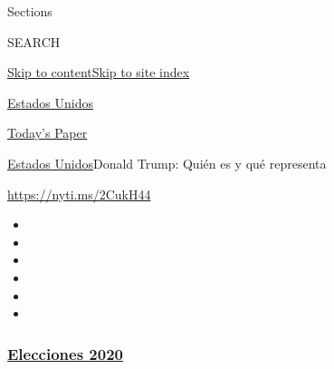 Sections

SEARCH

\protect\hyperlink{site-content}{Skip to
content}\protect\hyperlink{site-index}{Skip to site index}

\href{https://www.nytimes3xbfgragh.onion/es/section/estados-unidos}{Estados
Unidos}

\href{https://myaccount.nytimes3xbfgragh.onion/auth/login?response_type=cookie\&client_id=vi}{}

\href{https://www.nytimes3xbfgragh.onion/section/todayspaper}{Today's
Paper}

\href{/es/section/estados-unidos}{Estados Unidos}\textbar{}Donald Trump:
Quién es y qué representa

\url{https://nyti.ms/2CukH44}

\begin{itemize}
\item
\item
\item
\item
\item
\item
\end{itemize}

\hypertarget{elecciones-2020}{%
\subsubsection{\texorpdfstring{\href{https://www.nytimes3xbfgragh.onion/es/section/estados-unidos?name=styln-elections-es\&region=TOP_BANNER\&block=storyline_menu_recirc\&action=click\&pgtype=Interactive\&impression_id=485ec8b0-f1d9-11ea-a843-dd2d420313bb\&variant=undefined}{Elecciones
2020}}{Elecciones 2020}}\label{elecciones-2020}}

